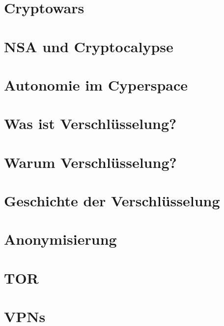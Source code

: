 \documentclass[utf8x]{beamer}
\begin{document}
\section{Cryptowars} 

\section{NSA und Cryptocalypse} 

\section{Autonomie im Cyperspace} 

\section{Was ist Verschlüsselung?} 
\section{Warum Verschlüsselung?} 
\section{Geschichte der Verschlüsselung} 

\section{Anonymisierung} 

\section{TOR} 
\section{VPNs} 
\end{document}
